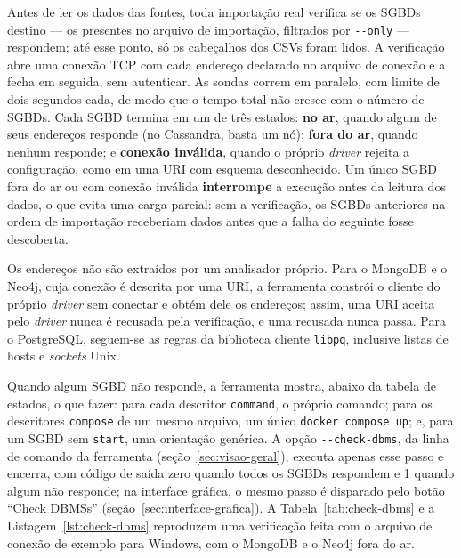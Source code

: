 Antes de ler os dados das fontes, toda importação real verifica se os SGBDs destino ---
os presentes no arquivo de importação, filtrados por \texttt{-{}-only} --- respondem;
até esse ponto, só os cabeçalhos dos CSVs foram lidos. A
verificação abre uma conexão TCP com cada endereço declarado no arquivo de conexão e a
fecha em seguida, sem autenticar. As sondas correm em paralelo, com limite de dois
segundos cada, de modo que o tempo total não cresce com o número de SGBDs. Cada SGBD
termina em um de três estados: \textbf{no ar}, quando algum de seus endereços responde
(no Cassandra, basta um nó); \textbf{fora do ar}, quando nenhum responde; e
\textbf{conexão inválida}, quando o próprio \textit{driver} rejeita a configuração, como
em uma URI com esquema desconhecido. Um único SGBD fora do ar ou com conexão inválida
\textbf{interrompe} a execução antes da leitura dos dados, o que evita uma carga parcial:
sem a verificação, os SGBDs anteriores na ordem de importação receberiam dados antes que
a falha do seguinte fosse descoberta.

Os endereços não são extraídos por um analisador próprio. Para o MongoDB e o Neo4j,
cuja conexão é descrita por uma URI, a ferramenta constrói o cliente do próprio
\textit{driver} sem conectar e obtém dele os endereços; assim, uma URI aceita pelo
\textit{driver} nunca é recusada pela verificação, e uma recusada nunca passa. Para o
PostgreSQL, seguem-se as regras da biblioteca cliente \texttt{libpq}, inclusive listas
de hosts e \textit{sockets} Unix.

Quando algum SGBD não responde, a ferramenta mostra, abaixo da tabela de estados, o
que fazer: para cada descritor \texttt{command}, o próprio comando; para os descritores
\texttt{compose} de um mesmo arquivo, um único \texttt{docker compose up}; e, para um
SGBD sem \texttt{start}, uma orientação genérica. A opção \texttt{-{}-check-dbms}, da
linha de comando da ferramenta (seção~\ref{sec:visao-geral}), executa apenas esse passo e
encerra, com código de saída zero quando todos os SGBDs respondem e 1 quando algum não
responde; na interface gráfica, o mesmo passo é disparado pelo botão ``Check DBMSs''
(seção~\ref{sec:interface-grafica}). A Tabela~\ref{tab:check-dbms} e a Listagem~\ref{lst:check-dbms} reproduzem
uma verificação feita com o arquivo de conexão de exemplo para Windows, com o MongoDB e
o Neo4j fora do ar.

